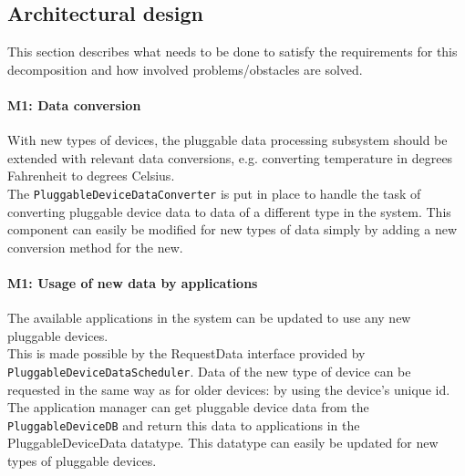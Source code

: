 \subsection{Architectural design}
    This section describes what needs to be done to satisfy the requirements for
    this decomposition and how involved problems/obstacles are solved.

    \paragraph{M1: Data conversion}
        With new types of devices, the pluggable data processing subsystem
        should be extended with relevant data conversions,
        e.g. converting temperature in degrees Fahrenheit to degrees Celsius. \\
        The \texttt{PluggableDeviceDataConverter} is put in place to handle the
        task of converting pluggable device data to data of a different type in the system.
        This component can easily be modified for new types of data simply by
        adding a new conversion method for the new.

    \paragraph{M1: Usage of new data by applications}
        The available applications in the system can be updated to use any
        new pluggable devices. \\
        This is made possible by the RequestData
        interface provided by \texttt{PluggableDeviceDataScheduler}.
        Data of the new type of device can be requested in the same way
        as for older devices: by using the device's unique id.
        The application manager can get pluggable device data from the
        \texttt{PluggableDeviceDB} and return this data to applications in
        the PluggableDeviceData datatype. This datatype can easily be
        updated for new types of pluggable devices.

